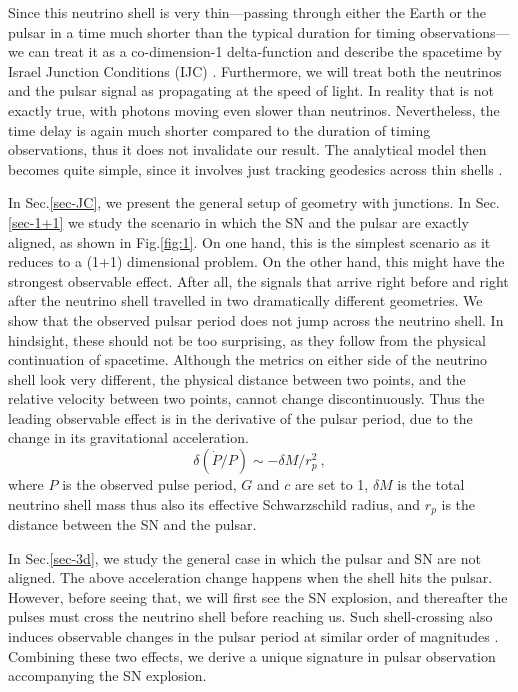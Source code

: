 \documentclass[aps,showpacs,onecolumn,floats,prd,superscriptaddress,nofootinbib]{revtex4}
\begin{document}
Since this neutrino shell is very thin---passing through either the Earth or the pulsar in a time much shorter than the typical duration for timing observations---we can treat it as a co-dimension-1 delta-function and describe the spacetime by Israel Junction Conditions (IJC) \cite{Isr66}. Furthermore, we will treat both the neutrinos and the pulsar signal as propagating at the speed of light. In reality that is not exactly true, with photons moving even slower than neutrinos. Nevertheless, the time delay is again much shorter compared to the duration of timing observations, thus it does not invalidate our result. The analytical model then becomes quite simple, since it involves just tracking geodesics across thin shells \cite{BouFre07,JohYan10,OluPie13}.

In Sec.\ref{sec-JC}, we present the general setup of geometry with junctions. In Sec.\ref{sec-1+1} we study the scenario in which the SN and the pulsar are exactly aligned, as shown in Fig.\ref{fig:1}. On one hand, this is the simplest scenario as it reduces to a (1+1) dimensional problem. On the other hand, this might have the strongest observable effect. After all, the signals that arrive right before and right after the neutrino shell travelled in two dramatically different geometries. We show that the observed pulsar period does not jump across the neutrino shell. In hindsight, these should not be too surprising, as they follow from the physical continuation of spacetime. Although the metrics on either side of the neutrino shell look very different, the physical distance between two points, and the relative velocity between two points, cannot change discontinuously. %
Thus the leading observable effect is in the derivative of the pulsar period, due to the change in its gravitational acceleration. 
\begin{equation}
\delta(\dot{P}/P) \sim -\delta M / r_p^2~,
\label{eq-main}
\end{equation}
where $P$ is the observed pulse period, $G$ and $c$ are set to 1, $\delta M$ is the total neutrino shell mass thus also its effective Schwarzschild radius, and $r_p$ is the distance between the SN and the pulsar. 

In Sec.\ref{sec-3d}, we study the general case in which the pulsar and SN are not aligned. The above acceleration change happens when the shell hits the pulsar. However, before seeing that, we will first see the SN explosion, and thereafter the pulses must cross the neutrino shell before reaching us. Such shell-crossing also induces observable changes in the pulsar period at similar order of magnitudes \cite{OluPie13}. Combining these two effects, we derive a unique signature in pulsar observation accompanying the SN explosion.
\end{document}
